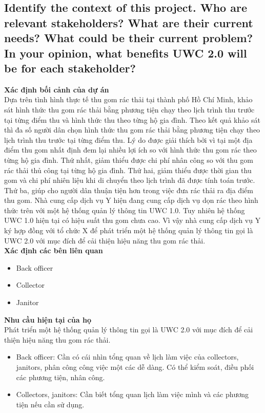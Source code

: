\documentclass[a4paper]{article}
\begin{document}
\subsection{Identify the context of this project. Who are relevant stakeholders? What are their current needs? What could be their current problem? In your opinion, what benefits UWC 2.0 will be for each stakeholder?}
\setlength{\parindent}{0cm}
\textbf{Xác định bối cảnh của dự án}\\ 
Dựa trên tình hình thực tế thu gom rác thải tại thành phố Hồ Chí Minh, khảo sát hình thức thu gom rác thải bằng phương tiện chạy theo lịch trình thu trước tại từng điểm thu và hình thức thu theo từng hộ gia đình. Theo kết quả khảo sát thì đa số người dân chọn hình thức  thu gom
rác thải bằng phương tiện chạy theo lịch trình thu trước tại từng điểm thu. Lý do được giải thích bởi vì tại một địa điểm thu gom nhất định đem lại nhiều lợi ích so với hình thức thu gom rác theo từng hộ gia đình. Thứ nhất, giảm thiểu được chi phí nhân công so với thu gom rác thải thủ công tại từng hộ gia đình. Thứ hai, giảm thiểu được thời gian thu gom và chi phí nhiên liệu khi di chuyển theo lịch trình đã được tính toán trước. Thứ ba, giúp cho người dân thuận tiện hơn trong việc đưa rác thải ra địa điểm thu gom.  Nhà cung cấp dịch vụ Y hiện đang cung cấp dịch vụ dọn rác theo hình thức trên với một hệ thống quản lý thông tin UWC 1.0. Tuy nhiên hệ thống UWC 1.0 hiện tại có hiệu suất thu gom chưa cao. Vì vậy nhà cung cấp dịch vụ Y ký hợp đồng với tổ chức X để phát triển một hệ thống quản lý thông tin gọi là UWC 2.0 với mục đích để cải thiện hiệu năng thu gom rác thải. \\
\textbf{Xác định các bên liên quan} 
\begin{itemize}
    \item Back officer 
    \item Collector 
    \item Janitor 
\end{itemize}
\textbf{Nhu cầu hiện tại của họ}\\ Phát triển một hệ thống quản lý thông tin gọi là UWC 2.0 với mục đích để cải thiện hiệu năng thu gom rác thải. 
\begin{itemize}
    \item Back officer: Cần có cái nhìn tổng quan về lịch làm việc của collectors, janitors, phân công công việc một các dễ dàng. Có thể kiểm soát, điều phối các phương tiện, nhân công. 
    \item Collectors, janitors: Cần biết tổng quan lịch làm việc mình và các phương tiện nếu cần sử dụng.  

\end{itemize}
\end{document}
